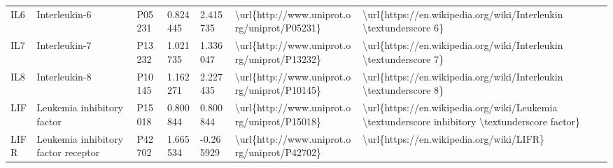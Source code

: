 \begin{table}[]
\begin{tabular}{lllllll}
\multicolumn{1}{l|}{IL6}      & Interleukin-6                                                 & P05231  & 0.824445           & 2.415735          & \textbackslash{}url\{http://www.uniprot.org/uniprot/P05231\} & \textbackslash{}url\{https://en.wikipedia.org/wiki/Interleukin \textbackslash{}textunderscore 6\}                                                                                                                                                                                                  \\
\multicolumn{1}{l|}{IL7}      & Interleukin-7                                                 & P13232  & 1.021735           & 1.336047          & \textbackslash{}url\{http://www.uniprot.org/uniprot/P13232\} & \textbackslash{}url\{https://en.wikipedia.org/wiki/Interleukin \textbackslash{}textunderscore 7\}                                                                                                                                                                                                  \\
\multicolumn{1}{l|}{IL8}      & Interleukin-8                                                 & P10145  & 1.162271           & 2.227435          & \textbackslash{}url\{http://www.uniprot.org/uniprot/P10145\} & \textbackslash{}url\{https://en.wikipedia.org/wiki/Interleukin \textbackslash{}textunderscore 8\}                                                                                                                                                                                                  \\
\multicolumn{1}{l|}{LIF}      & Leukemia inhibitory factor                                    & P15018  & 0.800844           & 0.800844          & \textbackslash{}url\{http://www.uniprot.org/uniprot/P15018\} & \textbackslash{}url\{https://en.wikipedia.org/wiki/Leukemia \textbackslash{}textunderscore inhibitory \textbackslash{}textunderscore factor\}                                                                                                                                                      \\
\multicolumn{1}{l|}{LIFR}     & Leukemia inhibitory factor receptor                           & P42702  & 1.665534           & -0.265929         & \textbackslash{}url\{http://www.uniprot.org/uniprot/P42702\} & \textbackslash{}url\{https://en.wikipedia.org/wiki/LIFR\}                                                                                                                                                                                                                                          \\

\end{tabular}
\end{table}
